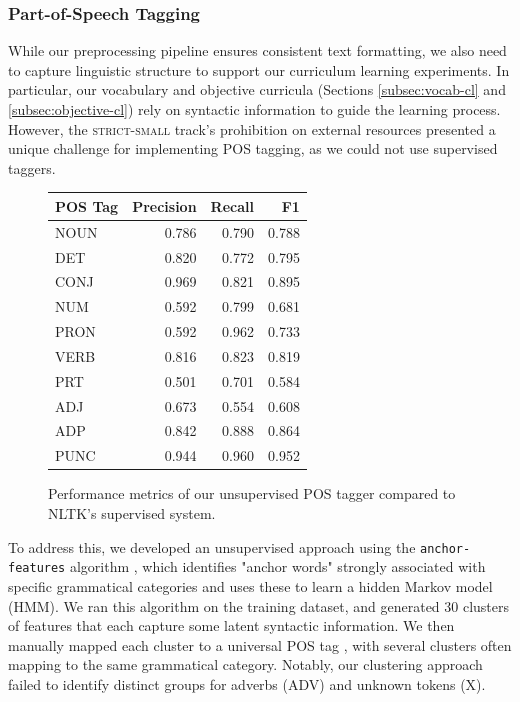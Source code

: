 \subsubsection{Part-of-Speech Tagging}

While our preprocessing pipeline ensures consistent text formatting, we also need to capture linguistic structure to support our curriculum learning experiments. In particular, our vocabulary and objective curricula (Sections \cref{subsec:vocab-cl} and \cref{subsec:objective-cl}) rely on syntactic information to guide the learning process. However, the \textsc{strict-small} track's prohibition on external resources presented a unique challenge for implementing POS tagging, as we could not use supervised taggers.

\begin{figure}
    \centering
    \small
    \begin{tabular}{lrrr}
    \toprule
    POS Tag & Precision & Recall & F1 \\
    \midrule
    NOUN & 0.786 & 0.790 & 0.788 \\
    DET & 0.820 & 0.772 & 0.795 \\
    CONJ & 0.969 & 0.821 & 0.895 \\
    NUM & 0.592 & 0.799 & 0.681 \\
    PRON & 0.592 & 0.962 & 0.733 \\   
    VERB & 0.816 & 0.823 & 0.819 \\
    PRT & 0.501 & 0.701 & 0.584 \\
    ADJ & 0.673 & 0.554 & 0.608 \\
    ADP & 0.842 & 0.888 & 0.864 \\
    PUNC & 0.944 & 0.960 & 0.952 \\
    \bottomrule
    \end{tabular}
    \caption{\label{tbl:unsupervised-pos-performance} Performance metrics of our unsupervised POS tagger compared to NLTK's supervised system.}
\end{figure}

To address this, we developed an unsupervised approach using the \texttt{anchor-features} algorithm \cite{stratos2016unsupervisedpos}, which identifies "anchor words" strongly associated with specific grammatical categories and uses these to learn a hidden Markov model (HMM). We ran this algorithm on the training dataset, and generated 30 clusters of features that each capture some latent syntactic information. We then manually mapped each cluster to a universal POS tag \cite{petrov2012universalpos}, with several clusters often mapping to the same grammatical category. Notably, our clustering approach failed to identify distinct groups for adverbs (ADV) and unknown tokens (X).

